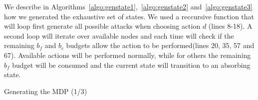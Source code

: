 We describe in Algorithms~\ref{algo:genstate1},~\ref{algo:genstate2} and~\ref{algo:genstate3} how we generated the exhaustive set of states.
We used a reccursive function that will loop first generate all possible attacks when choosing action $d$ (lines 8-18). A second loop will iterate over available nodes and each time will check if the remaining $b_f$ and $b_c$ budgets allow the action to be performed(lines 20, 35, 57 and 67). Available actions will be performed normally, while for others the remaining $b_f$ budget will be consumed and the current state will transition to an absorbing state.

\begin{algorithm}[htbp]
  \DontPrintSemicolon
  \LinesNumbered
\SetAlgoLined
    \caption{Generating the MDP (1/3)} 
    \label{algo:genstate1}
    \end{algorithm}
    
